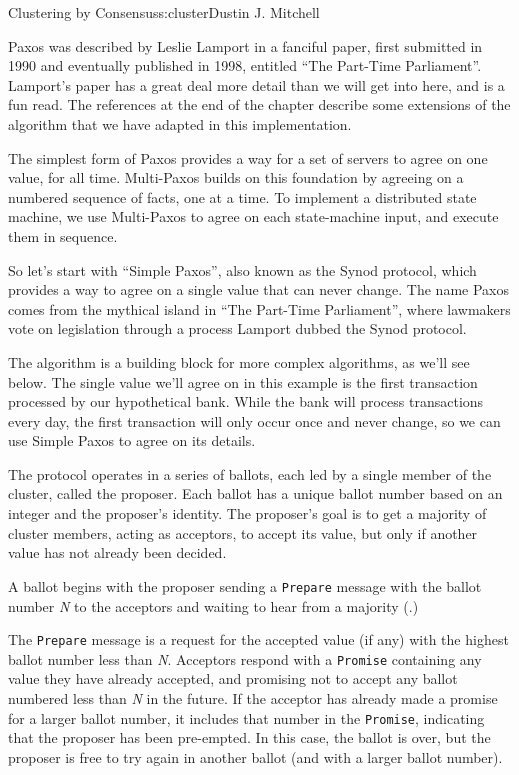\begin{aosachapter}{Clustering by Consensus}{s:cluster}{Dustin J. Mitchell}
\label{consensus-by-paxos}

Paxos was described by Leslie Lamport in a fanciful paper, first
submitted in 1990 and eventually published in 1998, entitled ``The
Part-Time Parliament''. Lamport's paper has a great deal more detail
than we will get into here, and is a fun read. The references at the end
of the chapter describe some extensions of the algorithm that we have
adapted in this implementation.

The simplest form of Paxos provides a way for a set of servers to agree
on one value, for all time. Multi-Paxos builds on this foundation by
agreeing on a numbered sequence of facts, one at a time. To implement a
distributed state machine, we use Multi-Paxos to agree on each
state-machine input, and execute them in sequence.

\label{simple-paxos}

So let's start with ``Simple Paxos'', also known as the Synod protocol,
which provides a way to agree on a single value that can never change.
The name Paxos comes from the mythical island in ``The Part-Time
Parliament'', where lawmakers vote on legislation through a process
Lamport dubbed the Synod protocol.

The algorithm is a building block for more complex algorithms, as we'll
see below. The single value we'll agree on in this example is the first
transaction processed by our hypothetical bank. While the bank will
process transactions every day, the first transaction will only occur
once and never change, so we can use Simple Paxos to agree on its
details.

The protocol operates in a series of ballots, each led by a single
member of the cluster, called the proposer. Each ballot has a unique
ballot number based on an integer and the proposer's identity. The
proposer's goal is to get a majority of cluster members, acting as
acceptors, to accept its value, but only if another value has not
already been decided.


A ballot begins with the proposer sending a \texttt{Prepare} message
with the ballot number \emph{N} to the acceptors and waiting to hear
from a majority (.)

The \texttt{Prepare} message is a request for the accepted value (if
any) with the highest ballot number less than \emph{N}. Acceptors
respond with a \texttt{Promise} containing any value they have already
accepted, and promising not to accept any ballot numbered less than
\emph{N} in the future. If the acceptor has already made a promise for a
larger ballot number, it includes that number in the \texttt{Promise},
indicating that the proposer has been pre-empted. In this case, the
ballot is over, but the proposer is free to try again in another ballot
(and with a larger ballot number).


\end{aosachapter}
